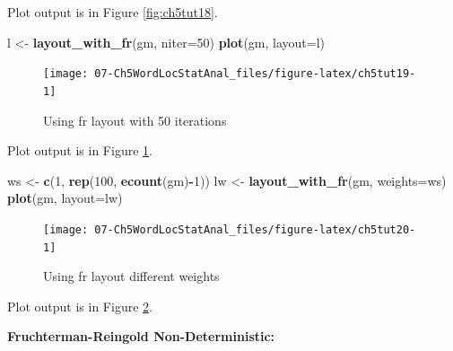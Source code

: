 \documentclass[
]{article}
\newenvironment{Shaded}{\begin{snugshade}}{\end{snugshade}}
\newcommand{\AttributeTok}[1]{\textcolor[rgb]{0.13,0.29,0.53}{#1}}
\newcommand{\DecValTok}[1]{\textcolor[rgb]{0.00,0.00,0.81}{#1}}
\newcommand{\FunctionTok}[1]{\textcolor[rgb]{0.13,0.29,0.53}{\textbf{#1}}}
\newcommand{\NormalTok}[1]{#1}
\newcommand{\OtherTok}[1]{\textcolor[rgb]{0.56,0.35,0.01}{#1}}
\newcommand{\SpecialCharTok}[1]{\textcolor[rgb]{0.81,0.36,0.00}{\textbf{#1}}}
\begin{document}
Plot output is in Figure \ref{fig:ch5tut18}.

\begin{Shaded}
\begin{Highlighting}[]
\NormalTok{l }\OtherTok{\textless{}{-}} \FunctionTok{layout\_with\_fr}\NormalTok{(gm, }\AttributeTok{niter=}\DecValTok{50}\NormalTok{)}
\FunctionTok{plot}\NormalTok{(gm, }\AttributeTok{layout=}\NormalTok{l)}
\end{Highlighting}
\end{Shaded}

\begin{figure}

{\centering \texttt{[image: 07-Ch5WordLocStatAnal\_files/figure-latex/ch5tut19-1]} 

}

\caption{Using fr layout with 50 iterations}\label{fig:ch5tut19}
\end{figure}

Plot output is in Figure \ref{fig:ch5tut19}.

\begin{Shaded}
\begin{Highlighting}[]
\NormalTok{ws }\OtherTok{\textless{}{-}}  \FunctionTok{c}\NormalTok{(}\DecValTok{1}\NormalTok{, }\FunctionTok{rep}\NormalTok{(}\DecValTok{100}\NormalTok{, }\FunctionTok{ecount}\NormalTok{(gm)}\SpecialCharTok{{-}}\DecValTok{1}\NormalTok{))}
\NormalTok{lw }\OtherTok{\textless{}{-}} \FunctionTok{layout\_with\_fr}\NormalTok{(gm, }\AttributeTok{weights=}\NormalTok{ws)}
\FunctionTok{plot}\NormalTok{(gm, }\AttributeTok{layout=}\NormalTok{lw)}
\end{Highlighting}
\end{Shaded}

\begin{figure}

{\centering \texttt{[image: 07-Ch5WordLocStatAnal\_files/figure-latex/ch5tut20-1]} 

}

\caption{Using fr layout different weights}\label{fig:ch5tut20}
\end{figure}

Plot output is in Figure \ref{fig:ch5tut20}.

\textbf{Fruchterman-Reingold Non-Deterministic:}
\end{document}
